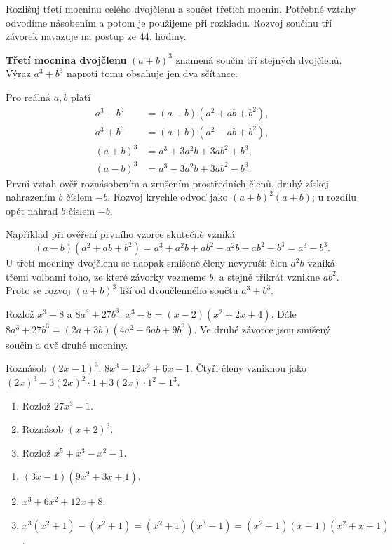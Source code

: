 \documentclass[11pt,a4paper]{article}
\begin{document}

Rozlišuj třetí mocninu celého dvojčlenu a součet třetích mocnin. Potřebné vztahy odvodíme násobením a potom je použijeme při rozkladu. Rozvoj součinu tří závorek navazuje na postup ze 44. hodiny.

\begin{definiceBox}[title={Definice},breakable=false]
\textbf{Třetí mocnina dvojčlenu} $(a+b)^3$ znamená součin tří stejných dvojčlenů. Výraz $a^3+b^3$ naproti tomu obsahuje jen dva sčítance.
\end{definiceBox}


Pro reálná $a,b$ platí
\begin{align*}
a^3-b^3&=(a-b)(a^2+ab+b^2),\\
a^3+b^3&=(a+b)(a^2-ab+b^2),\\
(a+b)^3&=a^3+3a^2b+3ab^2+b^3,\\
(a-b)^3&=a^3-3a^2b+3ab^2-b^3.
\end{align*}
První vztah ověř roznásobením a zrušením prostředních členů, druhý získej nahrazením $b$ číslem $-b$. Rozvoj krychle odvoď jako $(a+b)^2(a+b)$; u rozdílu opět nahraď $b$ číslem $-b$.

Například při ověření prvního vzorce skutečně vzniká
\[
(a-b)(a^2+ab+b^2)
=a^3+a^2b+ab^2-a^2b-ab^2-b^3=a^3-b^3.
\]
U třetí mocniny dvojčlenu se naopak smíšené členy nevyruší:
člen $a^2b$ vzniká třemi volbami toho, ze které závorky vezmeme $b$,
a stejně třikrát vznikne $ab^2$.
Proto se rozvoj $(a+b)^3$ liší od dvoučlenného součtu $a^3+b^3$.


\begin{prikladReseniBox}[title={Příklad 1},breakable=false]
Rozlož $x^3-8$ a $8a^3+27b^3$.
\tcblower
$x^3-8=(x-2)(x^2+2x+4)$. Dále $8a^3+27b^3=(2a+3b)(4a^2-6ab+9b^2)$. Ve druhé závorce jsou smíšený součin a dvě druhé mocniny.
\end{prikladReseniBox}


\begin{prikladReseniBox}[title={Příklad 2},breakable=false]
Roznásob $(2x-1)^3$.
\tcblower
$8x^3-12x^2+6x-1$. Čtyři členy vzniknou jako $(2x)^3-3(2x)^2\cdot1+3(2x)\cdot1^2-1^3$.
\end{prikladReseniBox}



\begin{zadaniReseniBox}[title={Procvičení},breakable=false]
\begin{enumerate}[label=\alph*)]
\item Rozlož $27x^3-1$.
\item Roznásob $(x+2)^3$.
\item Rozlož $x^5+x^3-x^2-1$.
\end{enumerate}
\tcblower
\begin{enumerate}[label=\alph*)]
\item $(3x-1)(9x^2+3x+1)$.
\item $x^3+6x^2+12x+8$.
\item $x^3(x^2+1)-(x^2+1)=(x^2+1)(x^3-1)=(x^2+1)(x-1)(x^2+x+1)$.
\end{enumerate}
\end{zadaniReseniBox}
\end{document}
